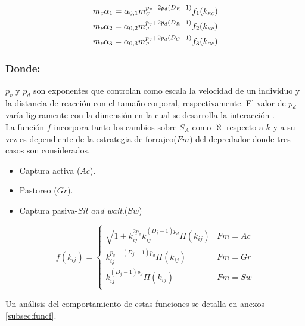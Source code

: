 \begin{equation}\label{eq:p4}
\begin{aligned}
&m_{\textit{\tiny C}} \alpha_1= \alpha_{0,1}m_{\textit{\tiny C}}^{p_v+2p_d(D_R-1)}f_1(k_{\textit{\tiny RC}})\\
&m_{\textit{\tiny P}} \alpha_2= \alpha_{0,2}m_{\textit{\tiny P}}^{p_v+2p_d(D_R-1)}f_2(k_{\textit{\tiny RP}})\\
&m_{\textit{\tiny P}} \alpha_3= \alpha_{0,3} m_{\textit{\tiny P}}^{p_v+2p_d(D_C-1)}f_3(k_{\textit{\tiny CP}})\\
\end{aligned}
\end{equation}
\subsubsection*{Donde:}
$p_v$ y $p_d$ son exponentes que controlan como escala la velocidad de un individuo  y la distancia de reacci\'on con el tama\~no corporal, respectivamente. El valor de $p_d$ var\'ia ligeramente con la dimensi\'on en la cual se desarrolla la interacci\'on \citep{pawar2012dimensionality}.\\
La funci\'on $f$ incorpora tanto los cambios sobre $S_A$ como $\aleph$ respecto a $k$ y a su vez es dependiente de la estrategia de forrajeo($Fm$) del depredador donde tres casos son considerados\citep{pawar2012dimensionality}.
\begin{itemize}
\item Captura activa ($Ac$).
\item Pastoreo ($Gr$).
\item Captura pasiva-\textit{Sit and wait}.($Sw$) 
\end{itemize}

\begin{equation}\label{eq:fkr}
f(k_{ij}) = 
\begin{cases}
\sqrt{1+k_{ij}^{2p_v}}k_{ij}^{(D_j-1)p_d} \Pi(k_{ij}) & Fm = Ac\\
k_{ij}^{p_v+(D_j-1)p_d}\Pi(k_{ij}) & Fm =Gr\\
k_{ij}^{(D_j-1)p_d}\Pi(k_{ij}) & Fm = Sw\\
\end{cases}
\end{equation}

Un an\'alisis del comportamiento de estas funciones se detalla en anexos \ref{subsec:funcf}.


